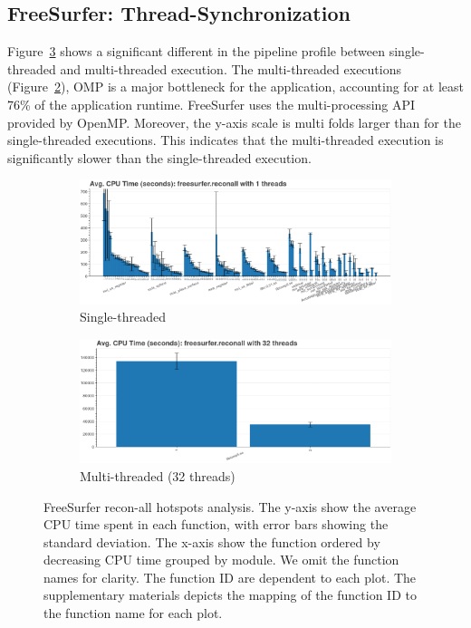 \documentclass[conference]{IEEEtran}
\begin{document}
\subsection{FreeSurfer: Thread-Synchronization}
Figure~\ref{fig:hotspots-freesurfer-reconall} shows a significant different in the pipeline profile between single-threaded and multi-threaded execution. The multi-threaded executions (Figure~\ref{subfig:hotspots-freesurfer-reconall-32threads}), OMP is a major bottleneck for the application, accounting for at least 76\% of the application runtime. FreeSurfer uses the multi-processing API provided by OpenMP. Moreover, the y-axis scale is multi folds larger than for the single-threaded executions. This indicates that the multi-threaded execution is significantly slower than the single-threaded execution.
					
\begin{figure}
	\centering
	\begin{subfigure}[t]{0.49\textwidth}
		\caption{Single-threaded}
		\label{subfig:hotspots-freesurfer-reconall-1thread}
		\includegraphics[width=\textwidth]{figures/hotspots-1threads-freesurfer-reconall-simple.png}
	\end{subfigure}
	\begin{subfigure}[t]{0.49\textwidth}
		\caption{Multi-threaded (32 threads)}
		\label{subfig:hotspots-freesurfer-reconall-32threads}
		\includegraphics[width=\textwidth]{figures/hotspots-32threads-freesurfer-reconall-simple.png}
	\end{subfigure}
	\caption{FreeSurfer recon-all hotspots analysis. The y-axis show the average CPU time spent in each function, with error bars showing the standard deviation. The x-axis show the function ordered by decreasing CPU time grouped by module. We omit the function names for clarity. The function ID are dependent to each plot. The supplementary materials depicts the mapping of the function ID to the function name for each plot.}
	\label{fig:hotspots-freesurfer-reconall}
\end{figure}
			
\end{document}
